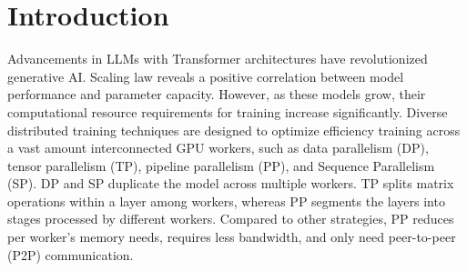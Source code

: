 \documentclass[sigplan,review]{acmart}
\begin{document}

 


\maketitle

\section{Introduction}

Advancements in LLMs with Transformer\cite{vaswani2023attention} architectures have revolutionized generative AI. Scaling law\cite{kaplan2020scalinglawsneurallanguage} reveals a positive correlation between model performance and parameter capacity. However, as these models grow, their computational resource requirements for training increase significantly. Diverse distributed training techniques are designed to optimize efficiency training across a vast amount interconnected GPU workers, such as data parallelism (DP), tensor parallelism (TP)\cite{shoeybi2019megatron, xu2021efficient, wang2022tesseract, li2023automatedtensormodelparallelism, cheng2023atpadaptivetensorparallelism}, pipeline parallelism (PP)\cite{gems, gpipe, dapple, li2021chimera, hanayo, qi2023zerobubblepipelineparallelism}, and Sequence Parallelism (SP)\cite{li2022sequence, jacobs2023Ulysses, liu2023ring, gu2024loongtrainefficienttraininglongsequence, liu2024wallfacerguidingtransformermodel}. DP and SP duplicate the model across multiple workers. TP splits matrix operations within a layer among workers, whereas PP segments the layers into stages processed by different workers. Compared to other strategies, PP reduces per worker's memory needs, requires less bandwidth, and only need peer-to-peer (P2P) communication.
\end{document}
